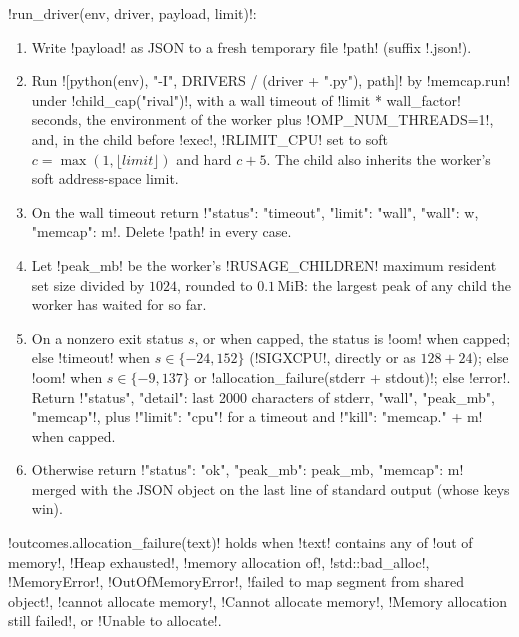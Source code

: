 \begin{algorithm}\label{alg:bench-tools-run-driver}
\py!run_driver(env, driver, payload, limit)!:
\begin{enumerate}
\item Write \py!payload! as JSON to a fresh temporary file \py!path! (suffix \code!.json!).
\item Run \py![python(env), "-I", DRIVERS / (driver + ".py"), path]! by \py!memcap.run! under \py!child_cap("rival")!, with a wall timeout of \py!limit * wall_factor! seconds, the environment of the worker plus \code!OMP_NUM_THREADS=1!, and, in the child before \code!exec!, \py!RLIMIT_CPU! set to soft $c=\max(1,\lfloor\mathit{limit}\rfloor)$ and hard $c+5$. The child also inherits the worker's soft address-space limit.
\item On the wall timeout return \py!{"status": "timeout", "limit": "wall", "wall": w, "memcap": m}!. Delete \py!path! in every case.
\item Let \py!peak_mb! be the worker's \py!RUSAGE_CHILDREN! maximum resident set size divided by $1024$, rounded to $0.1$\,MiB: the largest peak of any child the worker has waited for so far.
\item On a nonzero exit status $s$, or when capped, the status is \code!oom! when capped; else \code!timeout! when $s\in\{-24,152\}$ (\code!SIGXCPU!, directly or as $128+24$); else \code!oom! when $s\in\{-9,137\}$ or \py!allocation_failure(stderr + stdout)!; else \code!error!. Return \py!{"status", "detail": last 2000 characters of stderr, "wall", "peak_mb", "memcap"}!, plus \py!"limit": "cpu"! for a timeout and \py!"kill": "memcap." + m! when capped.
\item Otherwise return \py!{"status": "ok", "peak_mb": peak_mb, "memcap": m}! merged with the JSON object on the last line of standard output (whose keys win).
\end{enumerate}
\end{algorithm}

\py!outcomes.allocation_failure(text)! holds when \py!text! contains any of \code!out of memory!, \code!Heap exhausted!, \code!memory allocation of!, \code!std::bad_alloc!, \code!MemoryError!, \code!OutOfMemoryError!, \code!failed to map segment from shared object!, \code!cannot allocate memory!, \code!Cannot allocate memory!, \code!Memory allocation still failed!, or \code!Unable to allocate!.

